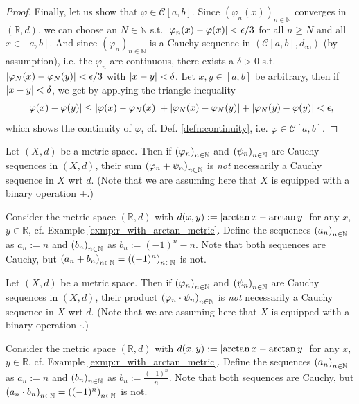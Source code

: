 \begin{proof}
	Finally, let us show that $\varphi\in\mathcal C[a, b]$. Since $\left(\varphi_n(x)\right)_{n\in\mathbb N}$ converges in $(\mathbb R, d)$, we can choose an $N\in\mathbb N$ s.t. $\abs{\varphi_n(x) - \varphi(x)} < \epsilon/3$ for all $n\geq N$ and all $x\in[a, b]$. And since $\left(\varphi_n\right)_{n\in\mathbb N}$ is a Cauchy sequence in $(\mathcal C[a, b], d_{\infty})$ (by assumption), i.e. the $\varphi_n$ are continuous, there exists a $\delta > 0$ s.t. $\abs{\varphi_N(x) - \varphi_{N}(y)} < \epsilon/3$ with $\abs{x - y} < \delta$. Let $x, y\in [a, b]$ be arbitrary, then if $\abs{x-y} < \delta$, we get by applying the triangle inequality
	\begin{align}
		\abs{\varphi(x) - \varphi(y)} \leq \abs{\varphi(x) - \varphi_N(x)} + \abs{\varphi_N(x) - \varphi_N(y)} + \abs{\varphi_N(y) - \varphi(y)} < \epsilon,
	\end{align}
	which shows the continuity of $\varphi$, cf. Def. \ref{defn:continuity}, i.e. $\varphi\in\mathcal C[a, b]$.
\end{proof}

\begin{remark}
	Let $(X, d)$ be a metric space. Then if $\seq[\varphi_n]$ and $\seq[\psi_n]$ are Cauchy sequences in $(X, d)$, their sum $\seq[\varphi_n + \psi_n]$ is \textit{not} necessarily a Cauchy sequence in $X$ wrt $d$. (Note that we are assuming here that $X$ is equipped with a binary operation $+$.)
\end{remark}

\begin{exmp}\label{exmp:counter_exmp_sum_Cauchy_not_Cauchy}
	Consider the metric space $(\mathbb R, d)$ with $d(x, y) := \abs{\arctan x - \arctan y}$ for any $x$, $y\in\mathbb R$, cf. Example \ref{exmp:r_with_arctan_metric}. Define the sequences $\seq[a_n]$ as $a_n := n$ and $\seq[b_n]$ as $b_n := (-1)^n - n$. Note that both sequences are Cauchy, but $\seq[a_n + b_n] = \seq[(-1)^n]$ is not.
\end{exmp}

\begin{remark}
	Let $(X, d)$ be a metric space. Then if $\seq[\varphi_n]$ and $\seq[\psi_n]$ are Cauchy sequences in $(X, d)$, their product $\seq[\varphi_n \cdot \psi_n]$ is \textit{not} necessarily a Cauchy sequence in $X$ wrt $d$. (Note that we are assuming here that $X$ is equipped with a binary operation $\cdot$.)
\end{remark}

\begin{exmp}\label{exmp:counter_exmp_prod_Cauchy_not_Cauchy}
	Consider the metric space $(\mathbb R, d)$ with $d(x, y) := \abs{\arctan x - \arctan y}$ for any $x$, $y\in\mathbb R$, cf. Example \ref{exmp:r_with_arctan_metric}. Define the sequences $\seq[a_n]$ as $a_n := n$ and $\seq[b_n]$ as $b_n := \frac{(-1)^n}{n}$. Note that both sequences are Cauchy, but $\seq[a_n \cdot b_n] = \seq[(-1)^n]$ is not.
\end{exmp}

